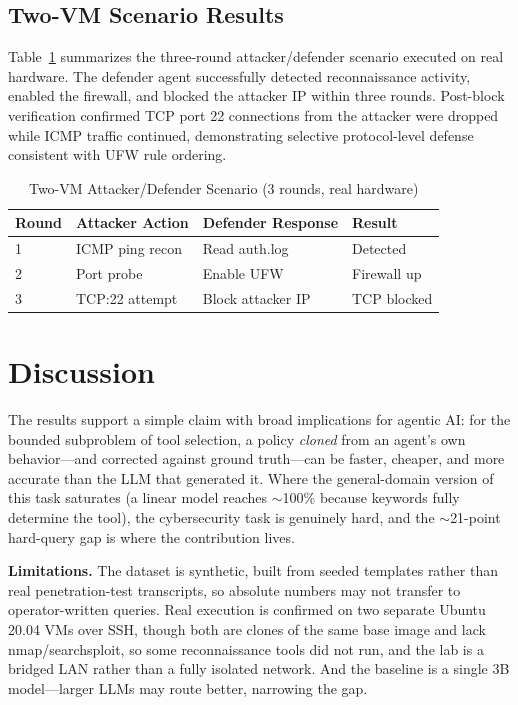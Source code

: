 \documentclass[conference]{IEEEtran}
\begin{document}
\subsection{Two-VM Scenario Results}

Table~\ref{tab:scenario} summarizes the three-round attacker/defender scenario
executed on real hardware. The defender agent successfully detected
reconnaissance activity, enabled the firewall, and blocked the attacker IP within
three rounds. Post-block verification confirmed TCP port 22 connections from the
attacker were dropped while ICMP traffic continued, demonstrating selective
protocol-level defense consistent with UFW rule ordering.

\begin{table}[htbp]
\caption{Two-VM Attacker/Defender Scenario (3 rounds, real hardware)}
\label{tab:scenario}
\centering
\begin{tabular}{llll}
\toprule
Round & Attacker Action & Defender Response & Result \\
\midrule
1 & ICMP ping recon & Read auth.log     & Detected \\
2 & Port probe      & Enable UFW        & Firewall up \\
3 & TCP:22 attempt  & Block attacker IP & TCP blocked \\
\bottomrule
\end{tabular}
\end{table}

\section{Discussion}

The results support a simple claim with broad implications for agentic AI: for
the bounded subproblem of tool selection, a policy \emph{cloned} from an agent's
own behavior---and corrected against ground truth---can be faster, cheaper, and
more accurate than the LLM that generated it. Where the general-domain version of
this task saturates (a linear model reaches $\sim$100\% because keywords fully
determine the tool), the cybersecurity task is genuinely hard, and the
$\sim$21-point hard-query gap is where the contribution lives.

\textbf{Limitations.} The dataset is synthetic, built from seeded templates
rather than real penetration-test transcripts, so absolute numbers may not
transfer to operator-written queries. Real execution is confirmed on two
separate Ubuntu 20.04 VMs over SSH, though both are clones of the same base image
and lack nmap/searchsploit, so some reconnaissance tools did not run, and the lab
is a bridged LAN rather than a fully isolated network. And the baseline is a
single 3B model---larger LLMs may route better, narrowing the gap.
\end{document}
